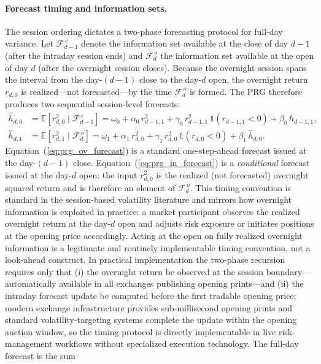 \documentclass[11pt,a4paper]{article}
\begin{document}
\paragraph{Forecast timing and information sets.}
The session ordering dictates a two-phase forecasting protocol for full-day variance. Let $\mathcal{F}_{d-1}^{\,c}$ denote the information set available at the close of day $d-1$ (after the intraday session ends) and $\mathcal{F}_{d}^{\,o}$ the information set available at the open of day $d$ (after the overnight session closes). Because the overnight session spans the interval from the day-$(d-1)$ close to the day-$d$ open, the overnight return $r_{d,0}$ is realized---not forecasted---by the time $\mathcal{F}_{d}^{\,o}$ is formed. The PRG therefore produces two sequential session-level forecasts:
\begin{align}
    \hat{h}_{d,0} &= \mathbb{E}\!\left[r^2_{d,0} \mid \mathcal{F}_{d-1}^{\,c}\right]
    = \omega_{0} + \alpha_{0}\, r^2_{d-1,1} + \gamma_{0}\, r^2_{d-1,1}\, \mathbb{1}(r_{d-1,1} < 0) + \beta_{0}\, h_{d-1,1},
    \label{eq:prg_ov_forecast} \\[2pt]
    \hat{h}_{d,1} &= \mathbb{E}\!\left[r^2_{d,1} \mid \mathcal{F}_{d}^{\,o}\right]
    = \omega_{1} + \alpha_{1}\, r^2_{d,0} + \gamma_{1}\, r^2_{d,0}\, \mathbb{1}(r_{d,0} < 0) + \beta_{1}\, \hat{h}_{d,0}.
    \label{eq:prg_in_forecast}
\end{align}
Equation~(\ref{eq:prg_ov_forecast}) is a standard one-step-ahead forecast issued at the day-$(d-1)$ close. Equation~(\ref{eq:prg_in_forecast}) is a \emph{conditional} forecast issued at the day-$d$ open: the input $r^2_{d,0}$ is the realized (not forecasted) overnight squared return and is therefore an element of $\mathcal{F}_{d}^{\,o}$. This timing convention is standard in the session-based volatility literature \citep{Linton2020,Opschoor2021} and mirrors how overnight information is exploited in practice: a market participant observes the realized overnight return at the day-$d$ open and adjusts risk exposure or initiates positions at the opening price accordingly. Acting at the open on fully realized overnight information is a legitimate and routinely implementable timing convention, not a look-ahead construct. In practical implementation the two-phase recursion requires only that (i) the overnight return be observed at the session boundary---automatically available in all exchanges publishing opening prints---and (ii) the intraday forecast update be computed before the first tradable opening price; modern exchange infrastructure provides sub-millisecond opening prints and standard volatility-targeting systems complete the update within the opening auction window, so the timing protocol is directly implementable in live risk-management workflows without specialized execution technology. The full-day forecast is the sum
\end{document}
